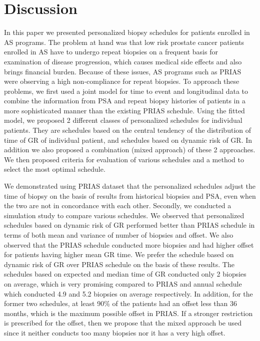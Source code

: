 
\section{Discussion}
\label{sec: discussion}
In this paper we presented personalized biopsy schedules for patients enrolled in AS programs. The problem at hand was that low risk prostate cancer patients enrolled in AS have to undergo repeat biopsies on a frequent basis for examination of disease progression, which causes medical side effects and also brings financial burden. Because of these issues, AS programs such as PRIAS were observing a high non-compliance for repeat biopsies. To approach these problems, we first used a joint model for time to event and longitudinal data to combine the information from PSA and repeat biopsy histories of patients in a more sophisticated manner than the existing PRIAS schedule. Using the fitted model, we proposed 2 different classes of personalized schedules for individual patients. They are schedules based on the central tendency of the distribution of time of GR of individual patient, and schedules based on dynamic risk of GR. In addition we also proposed a combination (mixed approach) of these 2 approaches. We then proposed criteria for evaluation of various schedules and a method to select the most optimal schedule.

We demonstrated using PRIAS dataset that the personalized schedules adjust the time of biopsy on the basis of results from historical biopsies and PSA, even when the two are not in concordance with each other. Secondly, we conducted a simulation study to compare various schedules. We observed that personalized schedules based on dynamic risk of GR performed better than PRIAS schedule in terms of both mean and variance of number of biopsies and offset. We also observed that the PRIAS schedule conducted more biopsies and had higher offset for patients having higher mean GR time. We prefer the schedule based on dynamic risk of GR over PRIAS schedule on the basis of these results. The schedules based on expected and median time of GR conducted only 2 biopsies on average, which is very promising compared to PRIAS and annual schedule which conducted 4.9 and 5.2 biopsies on average respectively. In addition, for the former two schedules, at least 90\% of the patients had an offset less than 36 months, which is the maximum possible offset in PRIAS. If a stronger restriction is prescribed for the offset, then we propose that the mixed approach be used since it neither conducts too many biopsies nor it has a very high offset.

